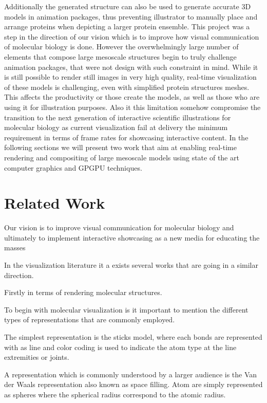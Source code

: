 Additionally the generated structure can also be used to generate accurate 3D models in animation packages, thus preventing illustrator to manually place and arrange proteins when depicting a larger protein ensemble.
This project was a step in the direction of our vision which is to improve how visual communication of molecular biology is done.
However the overwhelmingly large number of elements that compose large mesoscale structures begin to truly challenge animation packages, that were not design with such constraint in mind.
While it is still possible to render still images in very high quality, real-time visualization of these models is challenging, even with simplified protein structures meshes. 
This affects the productivity or those create the models, as well as those who are using it for illustration purposes.
Also it this limitation somehow compromise the transition to the next generation of interactive scientific illustrations for molecular biology as current visualization fail at delivery the minimum requirement in terms of frame rates for showcasing interactive content.
In the following sections we will present two work that aim at enabling real-time rendering and compositing of large mesoscale models using state of the art computer graphics and GPGPU techniques.

\section{Related Work}

Our vision is to improve visual communication for molecular biology and ultimately to implement interactive showcasing as a new media for educating the masses

In the visualization literature it a exists several works that are going in a similar direction.

Firstly in terms of rendering molecular structures.

To begin with molecular visualization is it important to mention the different types of representations that are commonly employed.

The simplest representation is the sticks model, where each bonds are represented with as line and color coding is used to indicate the atom type at the line extremities or joints.

A representation which is commonly understood by a larger audience is the Van der Waals representation also known as space filling. 
Atom are simply represented as spheres where the spherical radius correspond to the atomic radius.

